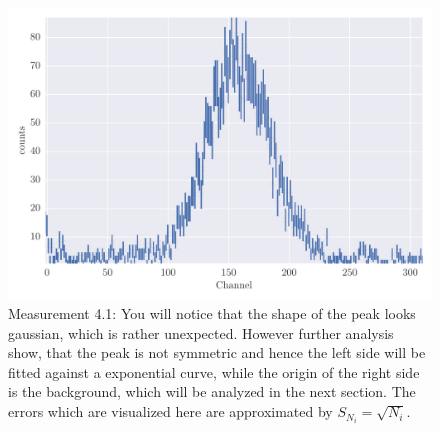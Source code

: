 \begin{figure}[htpb]
    \centering
    \includegraphics[width=1.0\linewidth]{analysis/figures/plot4_1}
    \caption{Measurement 4.1: You will notice that the shape
        of the peak looks gaussian, which is rather unexpected. However
        further analysis show, that the peak is not symmetric and hence the left 
        side will be fitted against a exponential curve, while the origin of the
        right side is the background, which will be analyzed in the next section.
        The errors which are visualized here are approximated by $S_{N_i} = \sqrt{N_i}$.}
    \label{fig:4_1}
\end{figure}
\clearpage
